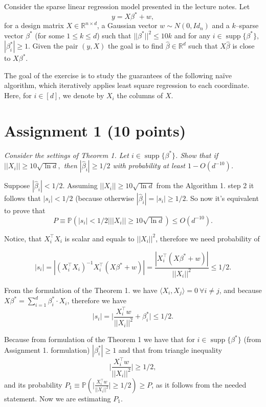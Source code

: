 \documentclass[]{article}
\title{}
\author{}
\DeclareMathOperator\supp{supp}
\begin{document}
Consider the sparse linear regression model presented in the lecture notes. Let
\begin{equation}\label{1}
	y=X\beta^*+w,
\end{equation}
for a design matrix $X\in\mathbb{R}^{n\times d}$, a Gaussian vector $w\sim N(0,Id_n)$ and a $k$--sparse vector $\beta^*$ (for some $1\le k\le d$) such that $||\beta^*||^2\le 10k$ and for any $i\in\supp\{\beta^*\}$$, $$|\beta_i^*|\ge 1$. Given the pair $(y, X)$ the goal is to find $\hat{\beta}\in\mathbb{R}^d$ such that $X\hat{\beta}$ is close to $X\beta^*$.

The goal of the exercise is to study the guarantees of the following naïve algorithm,
which iteratively applies least square regression to each coordinate. Here, for $i\in[d]$, we denote by
$X_i$ the columns of $X$.

\section*{Assignment 1 (10 points)}
\textit{Consider the settings of Theorem 1. Let $i \in \supp\{\beta^*\}$. Show that if $||X_i||\ge 10\sqrt{\ln d},$ then $|\hat{\beta}_i|\ge 1/2$ with probability at least $1 - O(d^{-10})$.}

Suppose $|\hat{\beta}_i| < 1/2$. Assuming $||X_i|| \ge 10\sqrt{\ln d}$ from the Algorithm 1. step 2 it follows that $|s_i|<1/2$ (because otherwise $|\hat{\beta}_i| =  |s_i| \ge 1/2$. So now it's equivalent to prove that 
$$P \equiv \mathbb{P}(|s_i| < 1/2 \big\vert ||X_i|| \ge 10\sqrt{\ln d}) \le O(d^{-10}).$$

Notice, that $X_i^\top X_i$ is scalar and equals to $||X_i||^2$, therefore we need probability of

$$|s_i| = |(X_i^\top X_i)^{-1} X_i^\top(X\beta^*+w)| = 
\frac{|X_i^\top(X\beta^*+w)|}{||X_i||^2}\le 1/2.$$

From the formulation of the Theorem 1. we have 
$\langle X_i, X_j\rangle = 0\: \forall i\ne j$, and because
$X\beta^* = \sum_{i=1}^d \beta_i^*\cdot X_i$, therefore we have
\begin{equation}
|s_i| = \bigg\lvert\frac{X_i^\top w}{||X_i||^2} + \beta_i^*\bigg\rvert \le 1/2.
\label{s_beta}
\end{equation}

Because from formulation of the Theorem 1 we have that for $i\in \supp\{\beta^*\}$ (from Assignment 1. formulation) $|\beta_i^*| \ge 1$ and that from triangle inequality
$$\bigg\lvert\frac{X_i^\top w}{||X_i||^2}\bigg\rvert \ge 1/2,$$
and its probability $P_1 \equiv \mathbb{P}\left(\bigg\lvert\frac{X_i^\top w}{||X_i||^2}\bigg\rvert \ge 1/2\right) \ge P$, as it follows from the needed statement. Now we are estimating $P_1$.
\end{document}
